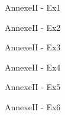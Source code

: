 
\begin{cadre}[B1][B4] 
  \begin{exercice}
    AnnexeII - Ex1
  \end{exercice}
  \begin{exercice}
    AnnexeII - Ex2
  \end{exercice}
  \begin{exercice}
    AnnexeII - Ex3
  \end{exercice}
  \begin{exercice}
    AnnexeII - Ex4
  \end{exercice}
  \begin{exercice}
    AnnexeII - Ex5
  \end{exercice}
  \begin{exercice}
    AnnexeII - Ex6
  \end{exercice}
\end{cadre}

